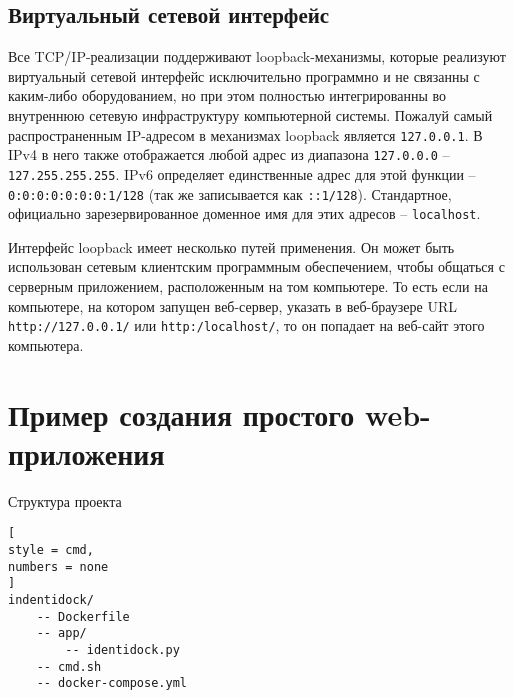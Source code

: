 \documentclass[%
	11pt,
	a4paper,
	utf8,
		]{article}
\begin{document}
\subsection{Виртуальный сетевой интерфейс}

Все TCP/IP-реализации поддерживают loopback-механизмы, которые реализуют виртуальный сетевой интерфейс исключительно программно и не связанны с каким-либо оборудованием, но при этом полностью интегрированны во внутреннюю сетевую инфраструктуру компьютерной системы. Пожалуй самый распространенным IP-адресом в механизмах loopback является \texttt{127.0.0.1}. В IPv4 в него также отображается любой адрес из диапазона \texttt{127.0.0.0} -- \texttt{127.255.255.255}. IPv6 определяет единственные адрес для этой функции -- \texttt{0:0:0:0:0:0:0:1/128} (так же записывается как \texttt{::1/128}). Стандартное, официально зарезервированное доменное имя для этих адресов -- \texttt{localhost}.

Интерфейс loopback имеет несколько путей применения. Он может быть использован сетевым клиентским программным обеспечением, чтобы общаться с серверным приложением, расположенным на том компьютере. То есть если на компьютере, на котором запущен веб-сервер, указать в веб-браузере URL \texttt{http://127.0.0.1/} или \texttt{http:/localhost/}, то он попадает на веб-сайт этого компьютера.



\section{Пример создания простого web-приложения}

Структура проекта \cite[]{mouat:docker-2017}
\begin{lstlisting}[
style = cmd,
numbers = none
]
indentidock/
    -- Dockerfile
    -- app/
        -- identidock.py
    -- cmd.sh
    -- docker-compose.yml
\end{lstlisting}
\end{document}
